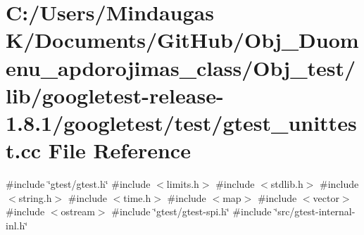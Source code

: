 \hypertarget{_obj__test_2lib_2googletest-release-1_88_81_2googletest_2test_2gtest__unittest_8cc}{}\section{C\+:/\+Users/\+Mindaugas K/\+Documents/\+Git\+Hub/\+Obj\+\_\+\+Duomenu\+\_\+apdorojimas\+\_\+class/\+Obj\+\_\+test/lib/googletest-\/release-\/1.8.1/googletest/test/gtest\+\_\+unittest.cc File Reference}
\label{_obj__test_2lib_2googletest-release-1_88_81_2googletest_2test_2gtest__unittest_8cc}
{\ttfamily \#include \char`\"{}gtest/gtest.\+h\char`\"{}}\newline
{\ttfamily \#include $<$limits.\+h$>$}\newline
{\ttfamily \#include $<$stdlib.\+h$>$}\newline
{\ttfamily \#include $<$string.\+h$>$}\newline
{\ttfamily \#include $<$time.\+h$>$}\newline
{\ttfamily \#include $<$map$>$}\newline
{\ttfamily \#include $<$vector$>$}\newline
{\ttfamily \#include $<$ostream$>$}\newline
{\ttfamily \#include \char`\"{}gtest/gtest-\/spi.\+h\char`\"{}}\newline
{\ttfamily \#include \char`\"{}src/gtest-\/internal-\/inl.\+h\char`\"{}}\newline
